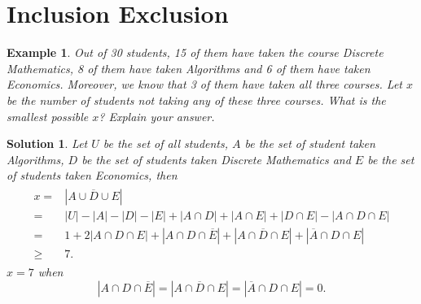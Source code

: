 \documentclass{../../cls/sig-alternate-05-2015}
\newtheorem{example}{Example}
\newtheorem*{solution*}{Solution}
\begin{document}
\section{Inclusion Exclusion}
\begin{example}
	Out of 30 students, 15 of them have taken the course Discrete Mathematics, 8 of them have taken Algorithms and 6 of them have taken Economics. Moreover, we know that 3 of them have taken all three courses. Let $x$ be the number of students not taking any of these three courses. What is the smallest possible $x$? Explain your answer.
\end{example}
\begin{solution*}
	Let $U$ be the set of all students, $A$ be the set of student taken Algorithms, $D$ be the set of students taken Discrete Mathematics and $E$ be the set of students taken Economics, then \begin{align}
		\begin{aligned}
		x = & \left|\overline{A \cup D \cup E}\right|\\
		= & \left|U\right| - \left|A\right| - \left|D\right| - \left|E\right| + \left|A \cap D\right| + \left|A \cap E\right| + \left|D \cap E\right| - \left|A \cap D \cap E\right|\\
		= & 1 + 2 \left|A \cap D \cap E\right| + \left|A \cap D \cap \overline{E}\right| + \left|A \cap \overline{D} \cap E\right| + \left|\overline{A} \cap D \cap E\right|\\
		\ge & 7.
		\end{aligned}
	\end{align} $x = 7$ when \begin{equation}
		\left|A \cap D \cap \overline{E}\right| = \left|A \cap \overline{D} \cap E\right| = \left|\overline{A} \cap D \cap E\right| = 0.
	\end{equation}
\end{solution*}
\end{document}
